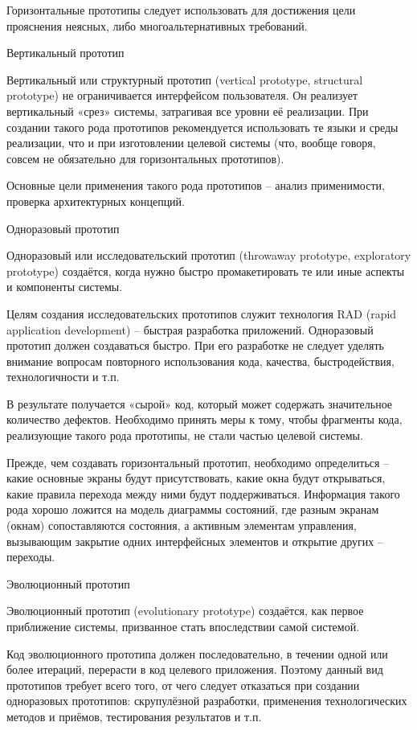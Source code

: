 \documentclass{../industrial-development}
\begin{document}
{Горизонтальные прототипы следует использовать для достижения цели прояснения
неясных, либо многоальтернативных требований.

\alert{Вертикальный прототип}

Вертикальный или структурный прототип (vertical prototype, structural prototype) не
ограничивается интерфейсом пользователя. Он реализует вертикальный «срез» системы,
затрагивая все уровни её реализации. При создании такого рода прототипов
рекомендуется использовать те языки и среды реализации, что и при изготовлении
целевой системы (что, вообще говоря, совсем не обязательно для горизонтальных
прототипов).

Основные цели применения такого рода прототипов – анализ применимости, проверка архитектурных концепций.

\alert{Одноразовый прототип}

Одноразовый или исследовательский прототип (throwaway prototype, exploratory
prototype) создаётся, когда нужно быстро промакетировать те или иные аспекты и
компоненты системы.

Целям создания исследовательских прототипов служит технология RAD (rapid
application development) – быстрая разработка приложений. Одноразовый прототип должен создаваться быстро. При его разработке не следует
уделять внимание вопросам повторного использования кода, качества, быстродействия,
технологичности и т.п.

В результате получается «сырой» код, который может содержать значительное количество дефектов. Необходимо принять меры к тому, чтобы фрагменты кода, реализующие такого рода прототипы, не стали частью целевой системы.

Прежде, чем создавать горизонтальный прототип,
необходимо определиться – какие основные экраны будут присутствовать, какие окна
будут открываться, какие правила перехода между ними будут поддерживаться.
Информация такого рода хорошо ложится на модель диаграммы состояний, где разным экранам (окнам) сопоставляются состояния, а активным элементам
управления, вызывающим закрытие одних интерфейсных элементов и открытие других – переходы.

\alert{Эволюционный прототип}

Эволюционный прототип (evolutionary prototype) создаётся, как первое приближение системы, призванное стать впоследствии самой системой.

Код эволюционного прототипа должен последовательно, в течении одной или
более итераций, перерасти в код целевого приложения. Поэтому данный вид прототипов
требует всего того, от чего следует отказаться при создании одноразовых прототипов:
скрупулёзной разработки, применения технологических методов и приёмов, тестирования
результатов и т.п.

}
\end{document}
